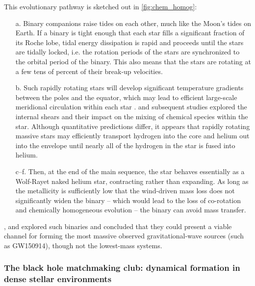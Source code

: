 \documentclass[iop,onecolumn]{revtex4-1}
\begin{document}
This evolutionary pathway is sketched out in \autoref{fig:chem_homog}:
\begin{itemize}
\item[a.] Binary companions raise tides on each other, much like the Moon's tides on Earth.  If a binary is tight enough that each star fills a significant fraction of its Roche lobe, tidal energy dissipation is rapid and proceeds until the stars are tidally locked, i.e. the rotation periods of the stars are synchronized to the orbital period of the binary. This also means that the stars are rotating at a few tens of percent of their break-up velocities.  
\item[b.] Such rapidly rotating stars will develop significant temperature gradients between the poles and the equator, which may lead to efficient large-scale meridional circulation within each star \citep{Eddington:1925,Sweet:1950}.  \citet{EndalSofia:1978} and subsequent studies \citep[e.g.,][]{Heger:2000,MaederMeynet:2000,Yoon:2006,Szecsi:2015} explored the internal shears and their impact on the mixing of chemical species within the star.  Although quantitative predictions differ, it appears that rapidly rotating massive stars may efficiently transport hydrogen into the core and helium out into the envelope until nearly all of the hydrogen in the star is fused into helium.  
\item[c--f.] Then, at the end of the main sequence, the star behaves essentially as a Wolf-Rayet naked helium star, contracting rather than expanding. As long as the metallicity is sufficiently low that the wind-driven mass loss does not significantly widen the binary -- which would lead to the loss of co-rotation and chemically homogeneous evolution \citep{deMink:2009} -- the binary can avoid mass transfer.  
\end{itemize}

\citet{MandeldeMink:2016,deMinkMandel:2016}, and \citet{Marchant:2016} explored such binaries and concluded that they could present a viable channel for forming the most massive observed gravitational-wave sources (such as GW150914), though not the lowest-mass systems.  

\subsubsection{The black hole matchmaking club: dynamical formation in dense stellar environments}
\end{document}
